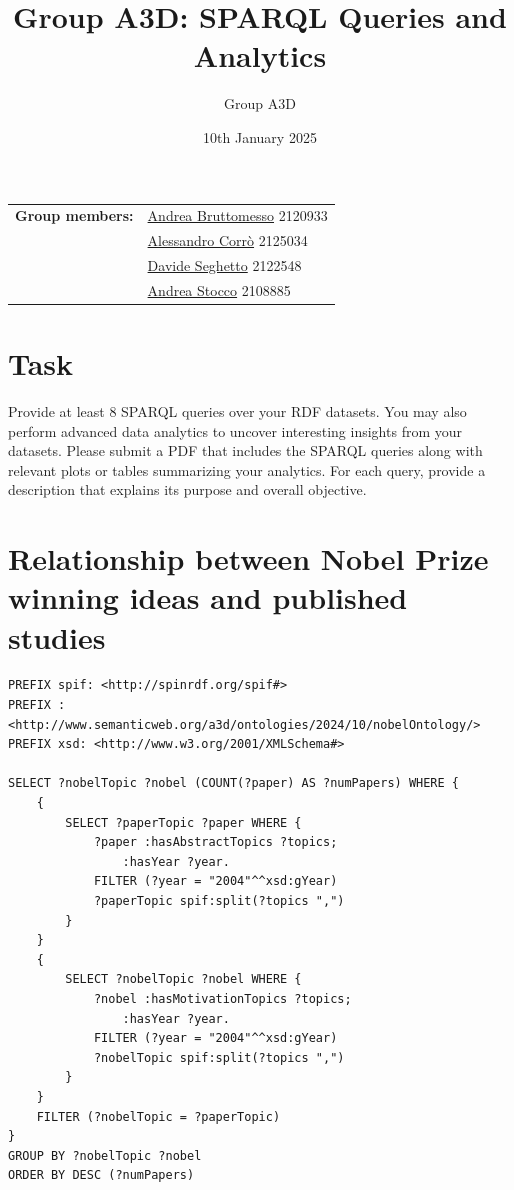 \documentclass{article}
\title{Group A3D: SPARQL Queries and Analytics}
\author{Group A3D}
\date{10th January 2025}
\begin{document}
\maketitle

\begin{tabular}{@{}ll}
	\textbf{Group members:}
	 & \href{mailto:andrea.bruttomesso.1@studenti.unipd.it}{Andrea Bruttomesso} 2120933 \\
	 & \href{mailto:alessandro.corro.1@studenti.unipd.it}{Alessandro Corr\`o} 2125034   \\
	 & \href{mailto:davide.seghetto@studenti.unipd.it}{Davide Seghetto} 2122548         \\
	 & \href{mailto:andrea.stocco.8@studenti.unipd.it}{Andrea Stocco} 2108885           \\
\end{tabular}


\section*{Task}
Provide at least 8 SPARQL queries over your RDF datasets. You may also perform advanced data analytics to uncover interesting insights from your datasets.
Please submit a PDF that includes the SPARQL queries along with relevant plots or tables summarizing your analytics.
For each query, provide a description that explains its purpose and overall objective.

\section{Relationship between Nobel Prize winning ideas and published studies}
\begin{lstlisting}
PREFIX spif: <http://spinrdf.org/spif#>
PREFIX : <http://www.semanticweb.org/a3d/ontologies/2024/10/nobelOntology/>
PREFIX xsd: <http://www.w3.org/2001/XMLSchema#>

SELECT ?nobelTopic ?nobel (COUNT(?paper) AS ?numPapers) WHERE {
    {
        SELECT ?paperTopic ?paper WHERE {
            ?paper :hasAbstractTopics ?topics;
               	:hasYear ?year.
            FILTER (?year = "2004"^^xsd:gYear)
            ?paperTopic spif:split(?topics ",")
        }
    }
    {
        SELECT ?nobelTopic ?nobel WHERE {
            ?nobel :hasMotivationTopics ?topics;
                :hasYear ?year.
            FILTER (?year = "2004"^^xsd:gYear)
            ?nobelTopic spif:split(?topics ",")
        }
    }
    FILTER (?nobelTopic = ?paperTopic)
}
GROUP BY ?nobelTopic ?nobel
ORDER BY DESC (?numPapers)
\end{lstlisting}
\end{document}
